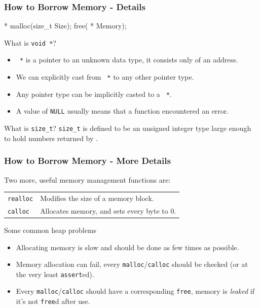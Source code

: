 \documentclass[smaller,handout,table]{beamer}
\begin{document}
\begin{frame}[fragile]
\frametitle{How to Borrow Memory - Details}
\begin{semiverbatim}
       * malloc(size_t Size);
       free( * Memory);
\end{semiverbatim}
\begin{block}{What is {\tt void *}?}
\begin{itemize}
\item {\tt {} *} is a pointer to an unknown data type, it consists only of an address.
\item We can explicitly cast from {\tt {} *} to any other pointer type.
\item Any pointer type can be implicitly casted to a {\tt {} *}.
\item A value of {\tt NULL} usually means that a function encountered an error.
\end{itemize}
\end{block}

\begin{block}{What is {\tt size\_t}?}
{\tt size\_t} is defined to be an unsigned integer type large enough to hold numbers returned by {\tt {}}.
\end{block}
\end{frame}

\begin{frame}
\frametitle{How to Borrow Memory - More Details}
Two more, useful memory management functions are:
\begin{center}
\begin{tabular}{l l}
\tt realloc&Modifies the size of a memory block.\\
\tt calloc&Allocates memory, and sets every byte to 0.\\
\end{tabular}
\end{center}
\begin{alertblock}{Some common heap problems}
\begin{itemize}
\item Allocating memory is slow and should be done as few times as possible.
\item Memory allocation can fail, every {\tt malloc}/{\tt calloc} should be checked (or at the very least {\tt assert}ed).
\item Every {\tt malloc}/{\tt calloc} should have a corresponding {\tt free}, memory is \emph{leaked} if it's not {\tt free}d after use.
\end{itemize}
\end{alertblock}
\end{frame}
\end{document}
